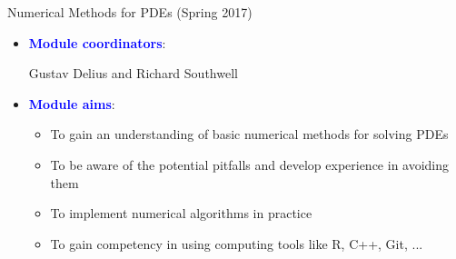 \documentclass{beamer}
\begin{document}


\begin{frame}{Numerical Methods for PDEs (Spring 2017)}

\begin{itemize}

\item{} \textcolor{blue}{\textbf{Module coordinators}}:

Gustav Delius and Richard Southwell

\item{} \textcolor{blue}{\textbf{Module aims}}:

\begin{itemize}

\item{} To gain an understanding of basic numerical methods for solving PDEs

\item{} To be aware of the potential pitfalls and develop experience in 
avoiding them

\item{} To implement numerical algorithms in practice

\item{} To gain competency in using computing tools like R, C++, Git, ...

\end{itemize}

\end{itemize}

\end{frame}

\end{document}
